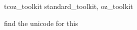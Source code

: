\begin{zsection}
  \SECTION tcoz\_toolkit \parents standard\_toolkit, oz\_toolkit
\end{zsection}










 find the unicode for this






